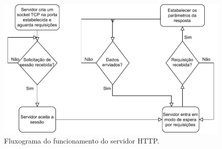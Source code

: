 \begin{figure}
	\centering
	\includegraphics[scale=0.75]{textuais/http-server.pdf}
	\caption[Fluxograma do funcionamento do servidor HTTP.]{Fluxograma do funcionamento do servidor HTTP.
		\label{fig:http-server}}
\end{figure}

